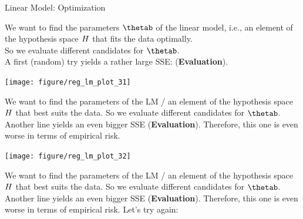 \documentclass[11pt,compress,t,notes=noshow, xcolor=table]{beamer}
\newenvironment{knitrout}{}{} %
\begin{document}
\begin{vbframe}{Linear Model: Optimization}

We want to find the parameters $\thetab$ of the linear model, i.e., an element of the hypothesis space $H$ that fits the data optimally.\\

So we evaluate different candidates for $\thetab$.\\

A first (random) try yields a rather large SSE: (\textbf{Evaluation}).
\lz

\begin{knitrout}\scriptsize
{}\color{fgcolor}

{\centering \texttt{[image: figure/reg\_lm\_plot\_31]} 

}



\end{knitrout}

\framebreak

We want to find the parameters of the LM / an element of the hypothesis space $H$ that best suits the data.
So we evaluate different candidates for $\thetab$.\\

Another line yields an even bigger SSE (\textbf{Evaluation}). Therefore, this one is even worse in
terms of empirical risk.

\begin{knitrout}\scriptsize
{}\color{fgcolor}

{\centering \texttt{[image: figure/reg\_lm\_plot\_32]} 

}



\end{knitrout}

\framebreak

We want to find the parameters of the LM / an element of the hypothesis space $H$ that best suits the data.
So we evaluate different candidates for $\thetab$.\\

Another line yields an even bigger SSE (\textbf{Evaluation}). Therefore, this one is even worse in
terms of empirical risk. Let's try again:

\begin{knitrout}\scriptsize
{}\color{fgcolor}


\end{knitrout}
\end{vbframe}
\end{document}
